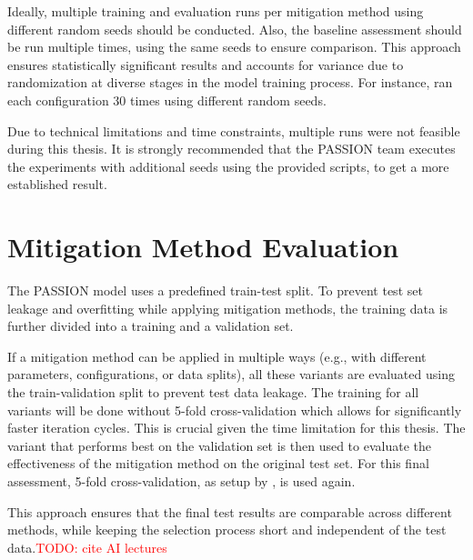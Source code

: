 \documentclass[12pt, a4paper, oneside]{book}   	%
\renewcommand{\todo}[1]{\textcolor{red}{TODO: #1}}
\begin{document}
			Ideally, multiple training and evaluation runs per mitigation method using different random seeds should be conducted. Also, the baseline assessment should be run multiple times, using the same seeds to ensure comparison. This approach ensures statistically significant results and accounts for variance due to randomization at diverse stages in the model training process. For instance, \textcite{Valentim_2019} ran each configuration 30 times using different random seeds.
			
			Due to technical limitations and time constraints, multiple runs were not feasible during this thesis. It is strongly recommended that the PASSION team executes the experiments with additional seeds using the provided scripts, to get a more established result.
		
		\section{Mitigation Method Evaluation} \label{chap:mitigationMethodsApplyMethod}
		The PASSION model uses a predefined train-test split. To prevent test set leakage and overfitting while applying mitigation methods, the training data is further divided into a training and a validation set. 
		
		If a mitigation method can be applied in multiple ways (e.g., with different parameters, configurations, or data splits), all these variants are evaluated using the train-validation split to prevent test data leakage. The training for all variants will be done without 5-fold cross-validation which allows for significantly faster iteration cycles. This is crucial given the time limitation for this thesis. The variant that performs best on the validation set is then used to evaluate the effectiveness of the mitigation method on the original test set. For this final assessment, 5-fold cross-validation, as setup by \textcite{Gottfrois2024}, is used again.
		
		This approach ensures that the final test results are comparable across different methods, while keeping the selection process short and independent of the test data.\todo{cite AI lectures}

		
\end{document}
